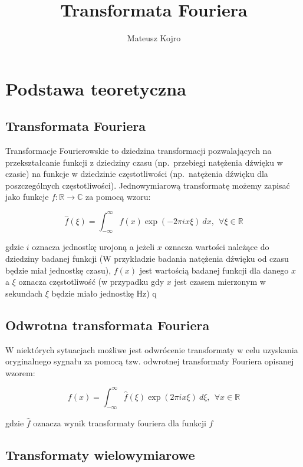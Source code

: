 \documentclass{artikel3}
\title{Transformata Fouriera}
\author{Mateusz Kojro}
\date{}
\begin{document}
\maketitle

\section{Podstawa teoretyczna}

\subsection{Transformata Fouriera}
Transformacje Fourierowskie to dziedzina transformacji pozwalających na przekształcanie
funkcji z dziedziny czasu (np.\ przebiegi natężenia dźwięku w czasie) na funkcje w dziedzinie częstotliwości (np.\ natężenia dźwięku dla poszczególnych częstotliwości). Jednowymiarową transformatę możemy zapisać jako funkcje $ f: \mathbb{R} \to \mathbb{C} $ za pomocą wzoru:

\begin{equation}
    \hat{f}(\xi) = \int_{-\infty}^{\infty} f(x) \exp{(-2 \pi i x \xi)} \ dx, \ \ \forall \xi \in \mathbb{R}
\end{equation}

gdzie $i$ oznacza jednostkę urojoną a jeżeli $x$ oznacza wartości należące do dziedziny badanej funkcji (W przykładzie badania natężenia dźwięku od czasu będzie miał jednostkę czasu), $f(x)$ jest wartością badanej funkcji dla danego $x$ a $\xi$ oznacza częstotliwość (w przypadku gdy $x$ jest czasem mierzonym w sekundach $\xi$ będzie miało jednostkę Hz)
q

\subsection{Odwrotna transformata Fouriera}

W niektórych sytuacjach możliwe jest odwrócenie transformaty w celu uzyskania oryginalnego sygnału za pomocą tzw. odwrotnej transformaty Fouriera opisanej wzorem:

\begin{equation}
f(x) = \int_{-\infty}^{\infty} \hat{f}(\xi) \exp{(2 \pi i x \xi)} \ d\xi, \ \ \forall x \in \mathbb{R}
\end{equation}

gdzie $\hat{f}$ oznacza wynik transformaty fouriera dla funkcji $f$

\subsection{Transformaty wielowymiarowe}
\end{document}
